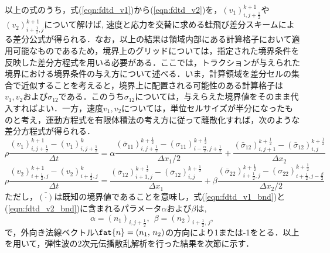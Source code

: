 以上の式のうち，式(\ref{eqn:fdtd_v1})から(\ref{eqn:fdtd_v2})を，$(v_1)^{k+1}_{i,j+\frac{1}{2}}$や$(v_2)^{k+1}_{i+\frac{1}{2},j}$について解けば, 速度と応力を交替に求める蛙飛び差分スキームによる差分公式が得られる．なお，以上の結果は領域内部にある計算格子において適用可能なものであるため，境界上のグリッドについては，指定された境界条件を反映した差分方程式を用いる必要がある．ここでは，トラクションが与えられた境界における境界条件の与え方について述べる．いま，計算領域を差分セルの集合で近似することを考えると，境界上に配置される可能性のある計算格子は$v_1, v_2$および$\sigma_{12}$である．このうち$\sigma_{12}$については，与えらえた境界値をそのまま代入すればよい．一方，速度$v_1, v_2$については，単位セルサイズが半分になったものと考え，運動方程式を有限体積法の考え方に従って離散化すれば，次のような差分方程式が得られる．
\begin{equation}
	\rho \frac{(v_1)_{i,j+\frac{1}{2}}^{k+1}-(v_1)^k_{i,j+\frac{1}{2}}}{\Delta t}
	=
	\alpha
	\frac{ 
		(\bar\sigma_{11})^{k+\frac{1}{2}}_{i,j+\frac{1}{2}}
		-(\sigma_{11})^{k+\frac{1}{2}}_{i-\frac{\alpha}{2},j+\frac{1}{2}} 
	}
	{\Delta x_1/2}
	+
	\frac{(\bar \sigma_{12})^{k+\frac{1}{2}}_{i,j+1}-(\bar \sigma_{12})^{k+\frac{1}{2}}_{i,j}}{\Delta x_2}
	\label{eqn:fdtd_v1_bnd}
\end{equation}
\begin{equation}
	\rho \frac{(v_2)_{i+\frac{1}{2},j}^{k+1}-(v_2)^k_{i+\frac{1}{2},j}}{\Delta t}
	=
	\frac{(\bar\sigma_{12})^{k+\frac{1}{2}}_{i+1,j}-(\bar\sigma_{12})^{k+\frac{1}{2}}_{i,j}}{\Delta x_1}
	+
	\beta
	\frac{ 
		(\bar \sigma_{22})^{k+\frac{1}{2}}_{i+\frac{1}{2},j}
		-(\sigma_{22})^{k+\frac{1}{2}}_{i+\frac{1}{2},j-\frac{\beta}{2}} 
	}
	{\Delta x_2/2}
	\label{eqn:fdtd_v2_bnd}
\end{equation}
ただし，$\bar{(\cdot)}$は既知の境界値であることを意味し，式(\ref{eqn:fdtd_v1_bnd})と(\ref{eqn:fdtd_v2_bnd})に含まれるパラメータ$\alpha$および$\beta$は,
 \begin{equation}
	\alpha=(n_1)_{i,j+\frac{1}{2}}, \ \ \beta=(n_2)_{i+\frac{1}{2},\, j},
	\label{eqn:def_ab}
\end{equation}
で，外向き法線ベクトル$\fat{n}=(n_1,\, n_2)$の方向により1または-1をとる．以上を用いて，弾性波の2次元伝播散乱解析を行った結果を次節に示す．
